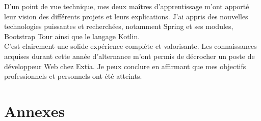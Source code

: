 \documentclass[12pt]{article}
\begin{document}
D'un point de vue technique, mes deux maîtres d’apprentissage m'ont apporté leur vision des différents projets et leurs explications. J'ai appris des nouvelles technologies puissantes et recherchées, notamment Spring et ses modules, Bootstrap Tour ainsi que le langage Kotlin. \\

C'est clairement une solide expérience complète et valorisante. Les connaissances acquises durant cette année d'alternance m'ont permis de décrocher un poste de développeur Web chez Extia. Je peux conclure en affirmant que mes objectifs professionnels et personnels ont été atteints. 
	

\newpage
\section{Annexes}
\end{document}
